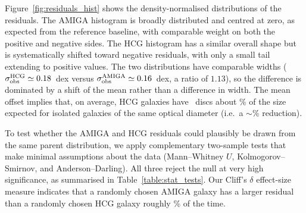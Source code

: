 
Figure~\ref{fig:residuals_hist} shows the density-normalised distributions
of the residuals. The AMIGA histogram is broadly distributed and
centred at zero, as expected from the reference baseline, with comparable
weight on both the positive and negative sides.  The HCG histogram has a
similar overall shape but is systematically shifted toward negative
residuals, with only a small tail extending to positive values.  The two distributions have
comparable widths ($\sigma_{\rm obs}^{\rm HCG} \simeq 0.18$~dex versus
$\sigma_{\rm obs}^{\rm AMIGA} \simeq 0.16$~dex, a ratio of $1.13$), so the
difference is dominated by a shift of the mean rather than a difference
in width. The mean offset implies that, on average, HCG galaxies
have \HI\ discs about \HCGSizeFractionPercent\% of the size expected for
isolated galaxies of the same optical diameter (i.e.\ a
$\sim$\HCGSizeReductionPercent\% reduction).

To test whether the AMIGA and HCG residuals could plausibly be drawn from
the same parent distribution, we apply complementary two-sample tests
that make minimal assumptions about the data (Mann--Whitney $U$,
Kolmogorov--Smirnov, and Anderson--Darling). All three reject the null
at very high significance, as summarised in Table~\ref{table:stat_tests}.
Our Cliff's $\delta$ effect-size measure indicates that a randomly chosen AMIGA galaxy has a larger residual than a
randomly chosen HCG galaxy roughly \CliffProbAmigaGreaterHCGPercent\% of
the time.
